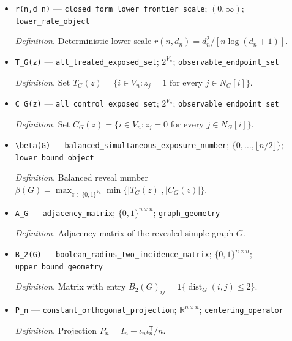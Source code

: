 \documentclass{article}
\begin{document}
\begin{itemize}
  \item \texttt{r(n,\allowbreak{}d\_\allowbreak{}n)} --- \texttt{closed\_\allowbreak{}form\_\allowbreak{}lower\_\allowbreak{}frontier\_\allowbreak{}scale}; \((0,\infty)\); \texttt{lower\_\allowbreak{}rate\_\allowbreak{}object}
  \par\smallskip\noindent\emph{Definition.} Deterministic lower scale \(r(n,d_n)=d_n^2/[n\log(d_n+1)]\).
  \item \texttt{T\_\allowbreak{}G(z)} --- \texttt{all\_\allowbreak{}treated\_\allowbreak{}exposed\_\allowbreak{}set}; \(2^{V_n}\); \texttt{observable\_\allowbreak{}endpoint\_\allowbreak{}set}
  \par\smallskip\noindent\emph{Definition.} Set \(T_G(z)=\{i\in V_n:z_j=1\text{ for every }j\in N_G[i]\}\).
  \item \texttt{C\_\allowbreak{}G(z)} --- \texttt{all\_\allowbreak{}control\_\allowbreak{}exposed\_\allowbreak{}set}; \(2^{V_n}\); \texttt{observable\_\allowbreak{}endpoint\_\allowbreak{}set}
  \par\smallskip\noindent\emph{Definition.} Set \(C_G(z)=\{i\in V_n:z_j=0\text{ for every }j\in N_G[i]\}\).
  \item \texttt{\textbackslash{}\allowbreak{}beta(G)} --- \texttt{balanced\_\allowbreak{}simultaneous\_\allowbreak{}exposure\_\allowbreak{}number}; \(\{0,\ldots,\lfloor n/2\rfloor\}\); \texttt{lower\_\allowbreak{}bound\_\allowbreak{}object}
  \par\smallskip\noindent\emph{Definition.} Balanced reveal number \(\beta(G)=\max_{z\in\{0,1\}^{V_n}}\min\{|T_G(z)|,|C_G(z)|\}\).
  \item \texttt{A\_\allowbreak{}G} --- \texttt{adjacency\_\allowbreak{}matrix}; \(\{0,1\}^{n\times n}\); \texttt{graph\_\allowbreak{}geometry}
  \par\smallskip\noindent\emph{Definition.} Adjacency matrix of the revealed simple graph \(G\).
  \item \texttt{B\_\allowbreak{}2(G)} --- \texttt{boolean\_\allowbreak{}radius\_\allowbreak{}two\_\allowbreak{}incidence\_\allowbreak{}matrix}; \(\{0,1\}^{n\times n}\); \texttt{upper\_\allowbreak{}bound\_\allowbreak{}geometry}
  \par\smallskip\noindent\emph{Definition.} Matrix with entry \(B_2(G)_{ij}=\mathbf 1\{\operatorname{dist}_G(i,j)\le2\}\).
  \item \texttt{P\_\allowbreak{}n} --- \texttt{constant\_\allowbreak{}orthogonal\_\allowbreak{}projection}; \(\mathbb R^{n\times n}\); \texttt{centering\_\allowbreak{}operator}
  \par\smallskip\noindent\emph{Definition.} Projection \(P_n=I_n-\iota_n\iota_n^{\mathsf T}/n\).

\end{itemize}
\end{document}
